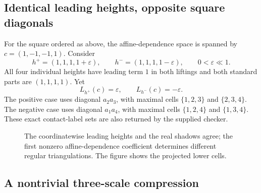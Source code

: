 \documentclass[11pt,a4paper]{article}
\numberwithin{equation}{section}
\theoremstyle{plain}
\newcommand{\eps}{\varepsilon}
\begin{document}
\subsection{Identical leading heights, opposite square diagonals}

For the square ordered as above, the affine-dependence space is spanned by
$c=(1,-1,-1,1)$. Consider
\[
 h^+=(1,1,1,1+\eps),\qquad h^-=(1,1,1,1-\eps),
 \qquad 0<\eps\ll1.
\]
All four individual heights have leading term $1$ in both liftings and
both standard parts are $(1,1,1,1)$. Yet
\[
 L_{h^+}(c)=\eps,\qquad L_{h^-}(c)=-\eps.
\]
The positive case uses diagonal $a_2a_3$, with maximal cells
$\{1,2,3\}$ and $\{2,3,4\}$. The negative case uses diagonal $a_1a_4$,
with maximal cells $\{1,2,4\}$ and $\{1,3,4\}$. These exact contact-label
sets are also returned by the supplied checker.

\begin{figure}[ht]
\centering
{}
\caption{The coordinatewise leading heights and the real shadows agree;
 the first nonzero affine-dependence coefficient determines different
 regular triangulations. The figure shows the projected lower cells.}
\end{figure}

\subsection{A nontrivial three-scale compression}
\end{document}
